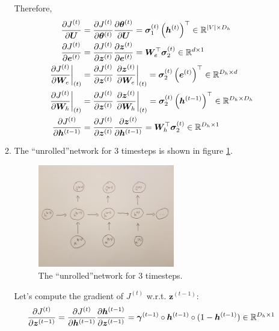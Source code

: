 \documentclass[10pt,reqno]{amsart}
\begin{document}
\begin{enumerate}[topsep=0pt,itemsep=3ex,partopsep=1ex,parsep=1ex]
\begin{enumerate}[itemsep=2ex]
    Therefore, 
    \begin{align*}
      \frac{\partial J^{(t)}}{\partial \bm{U}}
      &= \frac{\partial J^{(t)}}{\partial \bm{\theta}^{(t)}} \frac{\partial \bm{\theta}^{(t)}}{\partial \bm{U}}
      = \bm{\sigma}^{(t)}_1 \left(\bm{h}^{(t)}\right)^\top
      \in \mathbb{R}^{|V|\times D_h} \\
      \frac{\partial J^{(t)}}{\partial \bm{e}^{(t)}}
      &= \frac{\partial J^{(t)}}{\partial \bm{z}^{(t)}} \frac{\partial \bm{z}^{(t)}}{\partial \bm{e}^{(t)}} 
      = \bm{W}_e^\top \bm{\sigma}^{(t)}_2 
      \in \mathbb{R}^{d\times 1} \\
      \left. \frac{\partial J^{(t)}}{\partial \bm{W}_e} \right\rvert_{(t)}
      &= \frac{\partial J^{(t)}}{\partial \bm{z}^{(t)}} \left. \frac{\partial \bm{z}^{(t)}}{\partial \bm{W}_e} \right\rvert_{(t)}
      = \bm{\sigma}^{(t)}_2 \left(\bm{e}^{(t)}\right)^\top
      \in \mathbb{R}^{D_h \times d} \\
      \left. \frac{\partial J^{(t)}}{\partial \bm{W}_h} \right\rvert_{(t)}
      &= \frac{\partial J^{(t)}}{\partial \bm{z}^{(t)}} \left. \frac{\partial \bm{z}^{(t)}}{\partial \bm{W}_h} \right\rvert_{(t)}
      = \bm{\sigma}^{(t)}_2 \left(\bm{h}^{(t-1)}\right)^\top
      \in \mathbb{R}^{D_h \times D_h} \\
      \frac{\partial J^{(t)}}{\partial \bm{h}^{(t-1)}}
      &= \frac{\partial J^{(t)}}{\partial \bm{z}^{(t)}}  \frac{\partial \bm{z}^{(t)}}{\partial \bm{h}^{(t-1)}} 
      = \bm{W}_h^\top \bm{\sigma}^{(t)}_2 
      \in \mathbb{R}^{D_h\times 1} 
    \end{align*}
  \item The ``unrolled''network for 3 timesteps is shown in figure \ref{fig1}.
    \begin{figure}[h]
      \includegraphics[width=0.6\textwidth]{q3c.jpg}
      \caption{The ``unrolled''network for 3 timesteps.}
      \label{fig1}
    \end{figure}

    Let's compute the gradient of $J^{(t)}$ w.r.t. $\bm{z}^{(t-1)}$:
    \begin{equation*}
      \frac{\partial J^{(t)}}{\partial \bm{z}^{(t-1)}} 
      = \frac{\partial J^{(t)}}{\partial \bm{h}^{(t-1)}} \frac{\partial \bm{h}^{(t-1)}}{\partial \bm{z}^{(t-1)}}
      = \bm{\gamma}^{(t-1)} \circ \bm{h}^{(t-1)} \circ (1 - \bm{h}^{(t-1)}) 
      \in \mathbb{R}^{D_h\times 1} 
    \end{equation*}


\end{enumerate}
\end{enumerate}
\end{document}
